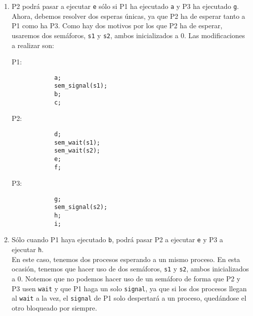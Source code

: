 \begin{ejercicio}
\begin{enumerate}
\begin{multicols}{3}
        P2:
        \begin{verbatim}
            d;
            sem_wait(s);
            e;
            f;
        \end{verbatim}

        P3:
        \begin{verbatim}
            g;
            sem_signal(s);
            h;
            i;
        \end{verbatim}
    \end{multicols}

        \item P2 podrá pasar a ejecutar \verb|e| sólo si P1 ha ejecutado \verb|a| y P3 ha ejecutado \verb|g|.\\

            Ahora, debemos resolver dos esperas únicas, ya que P2 ha de esperar tanto a P1 como ha P3. Como hay dos motivos por los que P2 ha de esperar, usaremos dos semáforos, \verb|s1| y \verb|s2|, ambos inicializados a 0. Las modificaciones a realizar son:
    \begin{multicols}{3}
        P1:
        \begin{verbatim}
            a;
            sem_signal(s1);
            b;
            c;
        \end{verbatim}
        
        P2:
        \begin{verbatim}
            d;
            sem_wait(s1);
            sem_wait(s2);
            e;
            f;
        \end{verbatim}

        P3:
        \begin{verbatim}
            g;
            sem_signal(s2);
            h;
            i;
        \end{verbatim}
    \end{multicols}
        \item Sólo cuando P1 haya ejecutado \verb|b|, podrá pasar P2 a ejecutar \verb|e| y P3 a ejecutar \verb|h|.\\
            En este caso, tenemos dos procesos esperando a un mismo proceso. En esta ocasión, tenemos que hacer uso de dos semáforos, \verb|s1| y \verb|s2|, ambos inicializados a 0. Notemos que no podemos hacer uso de un semáforo de forma que P2 y P3 usen \verb|wait| y que P1 haga un solo \verb|signal|, ya que si los dos procesos llegan al \verb|wait| a la vez, el \verb|signal| de P1 solo despertará a un proceso, quedándose el otro bloqueado por siempre.


\end{enumerate}
\end{ejercicio}
